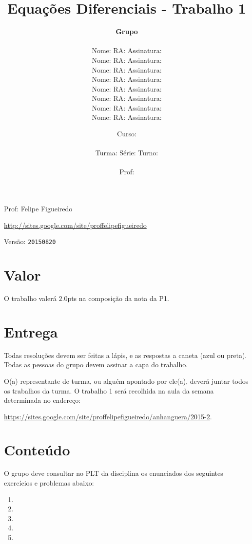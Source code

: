 \documentclass[a4paper]{article}
\date{
\bigskip
Curso: \underline{\hspace{8cm}}\\
\ \\
Turma: \underline{\hspace{1cm}} Série: \underline{\hspace{1cm}} Turno:
\underline{\hspace{1cm}}\\
\ \\
Prof: \underline{\hspace{8cm}}\\
}
\title{Equações Diferenciais - Trabalho 1}
\author{
{\bf Grupo }\\
\ \\
Nome: \underline{\hspace{6cm}} RA: \underline{\hspace{2cm}} Assinatura: \underline{\hspace{4cm}}\\
Nome: \underline{\hspace{6cm}} RA: \underline{\hspace{2cm}} Assinatura: \underline{\hspace{4cm}}\\
Nome: \underline{\hspace{6cm}} RA: \underline{\hspace{2cm}} Assinatura: \underline{\hspace{4cm}}\\
Nome: \underline{\hspace{6cm}} RA: \underline{\hspace{2cm}} Assinatura: \underline{\hspace{4cm}}\\
Nome: \underline{\hspace{6cm}} RA: \underline{\hspace{2cm}} Assinatura: \underline{\hspace{4cm}}\\
Nome: \underline{\hspace{6cm}} RA: \underline{\hspace{2cm}} Assinatura: \underline{\hspace{4cm}}\\
Nome: \underline{\hspace{6cm}} RA: \underline{\hspace{2cm}} Assinatura: \underline{\hspace{4cm}}\\
Nome: \underline{\hspace{6cm}} RA: \underline{\hspace{2cm}} Assinatura: \underline{\hspace{4cm}}\\
}
\begin{document}
\maketitle

\newpage
\parbox[c]{.825\textwidth}{\raggedright%
{Prof: Felipe Figueiredo\par}
{\url{http://sites.google.com/site/proffelipefigueiredo}\par}
}

Versão: \verb|20150820|




\section{Valor}
O trabalho valerá $2.0$pts na composição da nota da P1.

\section{Entrega}


Todas resoluções devem ser feitas a lápis, e as respostas a caneta
(azul ou preta). Todas as pessoas do grupo devem assinar a capa do
trabalho.

O(a) representante de turma, ou alguém apontado por ele(a), deverá
juntar todos os trabalhos da turma. O trabalho 1 será recolhida na
aula da semana determinada no endereço:

\url{https://sites.google.com/site/proffelipefigueiredo/anhanguera/2015-2}.

\section{Conteúdo}

O grupo deve consultar no PLT da disciplina os enunciados dos
seguintes exercícios e problemas abaixo:

\begin{enumerate}
\item 
\item 
\item 
\item 
\item 
\end{enumerate}
\end{document}
